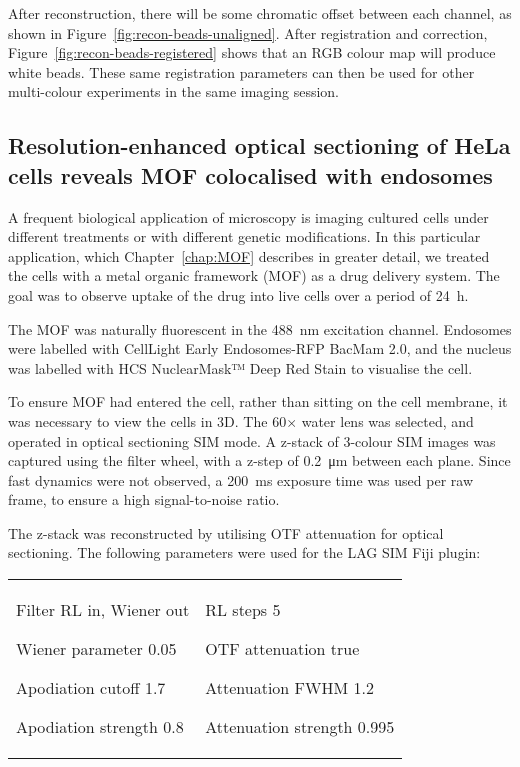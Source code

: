 After reconstruction, there will be some chromatic offset between each channel, as shown in Figure~\ref{fig:recon-beads-unaligned}. 
After registration and correction, Figure~\ref{fig:recon-beads-registered} shows that an RGB colour map will produce white beads. 
These same registration parameters can then be used for other multi-colour experiments in the same imaging session. 


\subsection{Resolution-enhanced optical sectioning of HeLa cells reveals MOF colocalised with endosomes}
A frequent biological application of microscopy is imaging cultured cells under different treatments or with different genetic modifications. 
In this particular application, which Chapter~\ref{chap:MOF} describes in greater detail, we treated the cells with a metal organic framework (MOF) as a drug delivery system. 
The goal was to observe uptake of the drug into live cells over a period of \SI{24}{\hour}. 

The MOF was naturally fluorescent in the \SI{488}{\nano\metre} excitation channel. 
Endosomes were labelled with CellLight Early Endosomes-RFP BacMam 2.0, and the nucleus was labelled with HCS NuclearMask™ Deep Red Stain to visualise the cell. 

To ensure MOF had entered the cell, rather than sitting on the cell membrane, it was necessary to view the cells in 3D. 
The 60$\times$ water lens was selected, and operated in optical sectioning SIM mode. 
A z-stack of 3-colour SIM images was captured using the filter wheel, with a z-step of \SI{0.2}{\micro\metre} between each plane. 
Since fast dynamics were not observed, a \SI{200}{\milli\second} exposure time was used per raw frame, to ensure a high signal-to-noise ratio. 

The z-stack was reconstructed by utilising OTF attenuation for optical sectioning. 
The following parameters were used for the LAG SIM Fiji plugin:\newline
\begin{tabular}{p{}p{}}
\begin{labelling}[margin={Attenuation strength}]
	\item[Filter] RL in, Wiener out
	\item[Wiener parameter] 0.05
	\item[Apodiation cutoff] 1.7
	\item[Apodiation strength] 0.8
\end{labelling} &
\begin{labelling}[margin={Attenuation strength}]
	\item[RL steps] 5
	\item[OTF attenuation] true
	\item[Attenuation FWHM] 1.2
	\item[Attenuation strength] 0.995 
\end{labelling} %
\end{tabular}

